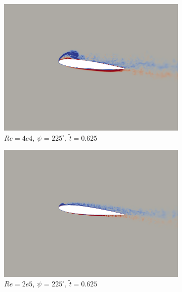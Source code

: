 \begin{figure}[H]
	\begin{subfigure}[b]{0.32\textwidth}
		\centering
		\includegraphics[width=1\textwidth]{figures/Vorticity_plots/Re_40k_1pt2/phase_225.png}
		\caption{$Re=4e4$, $\psi$ = $225^\circ$, $\tilde{t}=0.625$}
		\label{fig:Re_40k_1pt2_phi225}
	\end{subfigure}
	\begin{subfigure}[b]{0.32\textwidth}
		\centering
		\includegraphics[width=1\textwidth]{figures/Vorticity_plots/Re_200k_1pt2/phase_225.png}
		\caption{$Re=2e5$, $\psi$ = $225^\circ$, $\tilde{t}=0.625$}
		\label{fig:Re_200k_1pt2_phi225}
	\end{subfigure}
	\begin{subfigure}[b]{0.32\textwidth}
		\centering

\end{subfigure}
\end{figure}
